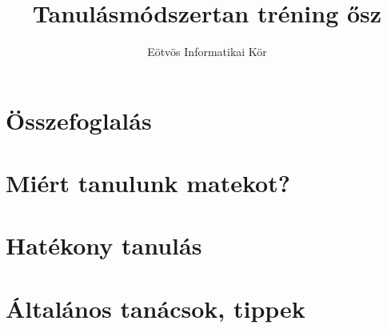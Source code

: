 \documentclass[12pt]{article}
\title{Tanulásmódszertan tréning ősz}
\author{Eötvös Informatikai Kör}
\date{ }
\begin{document}
\maketitle

\section{Összefoglalás}


\section{Miért tanulunk matekot?}


\section{Hatékony tanulás}


\section{Általános tanácsok, tippek}

\end{document}
